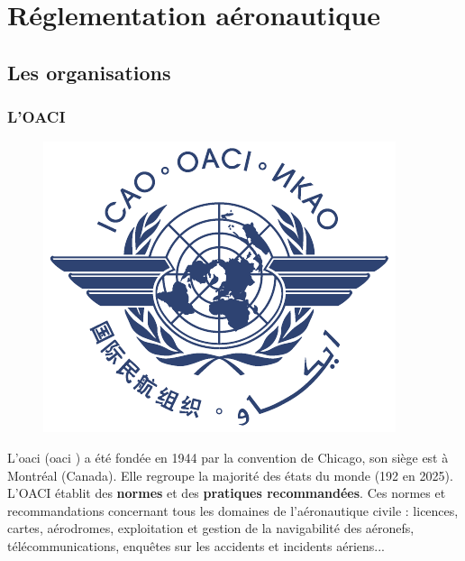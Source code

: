 \section{Réglementation aéronautique}
	\subsection{Les organisations}
		\subsubsection{L'OACI}
		
		\begin{figure}
		\includegraphics[width=0.9\linewidth]{02-Navigation/img/OACI-logo.pdf} 
		\end{figure}
		
		L'\acrshort{oaci} (\acrlong{oaci} ) a été fondée en 1944 par la convention de Chicago, son siège est à Montréal (Canada). Elle regroupe la majorité des états du monde (192 en 2025). \\
		
		L'OACI établit des \textbf{normes} et des \textbf{pratiques recommandées}. Ces normes et recommandations concernant tous les domaines de l'aéronautique civile : licences, cartes, aérodromes, exploitation et gestion de la navigabilité des aéronefs, télécommunications, enquêtes sur les accidents et incidents aériens...
		
		
